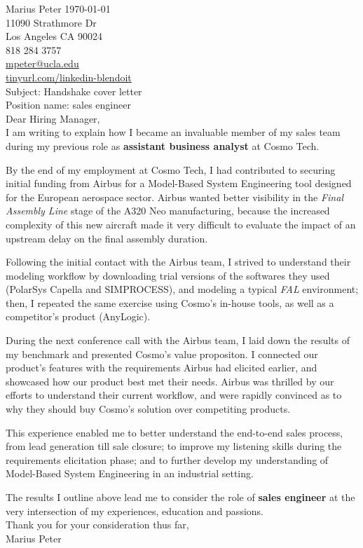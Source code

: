\documentclass[12pt]{article}
\begin{document}
\noindent Marius Peter \hfill \today\\
11090 Strathmore Dr\\
Los Angeles CA 90024\\
818 284 3757\\
\href{mailto:mpeter@ucla.edu}{mpeter@ucla.edu}\\
\url{tinyurl.com/linkedin-blendoit}\\[0.4cm]


\noindent Subject: Handshake cover letter\\
Position name: sales engineer\\
\vfill
Dear Hiring Manager,\\[0.4cm]

I am writing to explain how I became an invaluable member of my sales team during my previous role as \textbf{assistant business analyst} at Cosmo Tech.

By the end of my employment at Cosmo Tech, I had contributed to securing initial funding from Airbus for a Model-Based System Engineering tool designed for the European aerospace sector.
Airbus wanted better visibility in the \textit{Final Assembly Line} stage of the A320 Neo manufacturing, because the increased complexity of this new aircraft made it very difficult to evaluate the impact of an upstream delay on the final assembly duration.

Following the initial contact with the Airbus team, I strived to understand their modeling workflow by downloading trial versions of the softwares they used (PolarSys Capella and SIMPROCESS), and modeling a typical \textit{FAL} environment;
then, I repeated the same exercise using Cosmo's in-house tools, as well as a competitor's product (AnyLogic).

During the next conference call with the Airbus team, I laid down the results of my benchmark and presented Cosmo's value propositon.
I connected our product's features with the requirements Airbus had elicited earlier, and showcased how our product best met their needs.
Airbus was thrilled by our efforts to understand their current workflow, and were rapidly convinced as to why they should buy Cosmo's solution over competiting products.

This experience enabled me to better understand the end-to-end sales process, from lead generation till sale closure;
to improve my listening skills during the requirements elicitation phase;
and to further develop my understanding of Model-Based System Engineering in an industrial setting. 

The results I outline above lead me to consider the role of \textbf{sales engineer} at the very intersection of my experiences, education and passions.\\[0.4cm]

Thank you for your consideration thus far,\\[0.2cm]

Marius Peter
\end{document}
